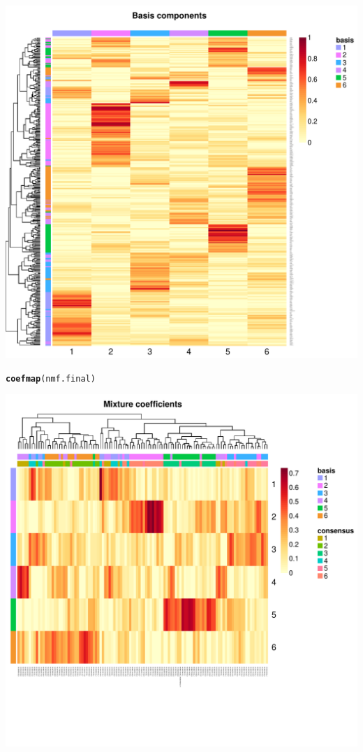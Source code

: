 \documentclass{article}\usepackage[]{graphicx}\usepackage[]{color}
\makeatletter
\def\maxwidth{ %
  \ifdim\Gin@nat@width>\linewidth
    \linewidth
  \else
    \Gin@nat@width
  \fi
}
\newcommand{\hlstd}[1]{\textcolor[rgb]{0.345,0.345,0.345}{#1}}%
\newcommand{\hlkwd}[1]{\textcolor[rgb]{0.737,0.353,0.396}{\textbf{#1}}}%
\newenvironment{kframe}{%
 \def\at@end@of@kframe{}%
 \ifinner\ifhmode%
  \def\at@end@of@kframe{\end{minipage}}%
  \begin{minipage}{\columnwidth}%
 \fi\fi%
 \def\FrameCommand##1{\hskip\@totalleftmargin \hskip-\fboxsep
 \colorbox{shadecolor}{##1}\hskip-\fboxsep
     \hskip-\linewidth \hskip-\@totalleftmargin \hskip\columnwidth}%
 \MakeFramed {\advance\hsize-\width
   \@totalleftmargin\z@ \linewidth\hsize
   \@setminipage}}%
 {\par\unskip\endMakeFramed%
 \at@end@of@kframe}
\newenvironment{knitrout}{}{} %
\makeatother
\begin{document}
\begin{knitrout}
{\centering \includegraphics[width=\maxwidth]{figure/nmf-plots-2} 

}


\begin{kframe}\begin{alltt}
\hlkwd{coefmap}\hlstd{(nmf.final)}
\end{alltt}
\end{kframe}

{\centering \includegraphics[width=\maxwidth]{figure/nmf-plots-3} 

}



\end{knitrout}
\end{document}
